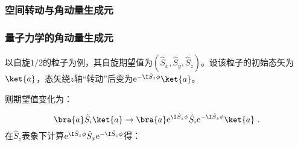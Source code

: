 
\begin{issues}
\issueMissDepend
\issueTODO
\end{issues}

\subsubsection{空间转动与角动量生成元}


\subsubsection{量子力学的角动量生成元}
以自旋$1/2$的粒子为例，其自旋期望值为$(\overline{\hat S_x},\overline{\hat S_y},\overline{\hat S_z})$。设该粒子的初始态矢为$\ket{a}$，态矢绕$z$轴“转动”后变为$\mathrm e^{- \I\hat S_z\phi}\ket{a}$。

则期望值变化为：

\begin{equation}
\bra{a}\hat S_i\ket{a}\rightarrow \bra{a}\mathrm e^{ \I\hat S_z\phi}\hat S_i\mathrm e^{- \I\hat S_z\phi}\ket{a}~.
\end{equation}
在$\hat S_z$表象下计算$\mathrm e^{ \I\hat S_z\phi}\hat S_x\mathrm e^{- \I\hat S_z\phi}$得：


